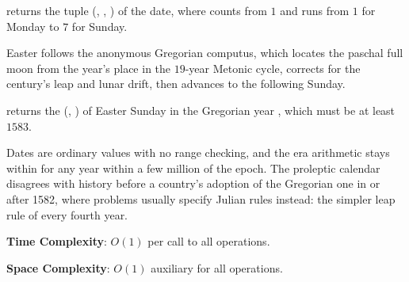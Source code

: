\begin{compactitem}
  \item {} returns the tuple (, , ) of the date, where  counts from $1$ and  runs from $1$ for Monday to $7$ for Sunday.
\end{compactitem}

Easter follows the anonymous Gregorian computus, which locates the paschal full moon from the year's place in the $19$-year Metonic cycle, corrects for the century's leap and lunar drift, then advances to the following Sunday.

\begin{compactitem}
  \item {} returns the (, ) of Easter Sunday in the Gregorian year , which must be at least $1583$.
\end{compactitem}

Dates are ordinary  values with no range checking, and the era arithmetic stays within  for any year within a few million of the epoch. The proleptic calendar disagrees with history before a country's adoption of the Gregorian one in or after 1582, where problems usually specify Julian rules instead: the simpler leap rule of every fourth year.

\textbf{Time Complexity}: $O(1)$ per call to all operations.

\textbf{Space Complexity}: $O(1)$ auxiliary for all operations.

